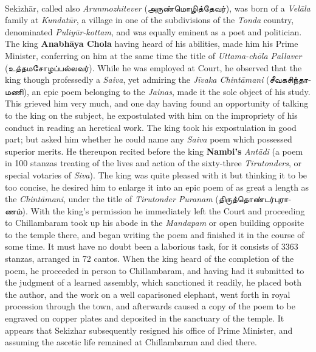 \documentclass{article}
\newcommand{\TamilText}[1]{\texttamil{#1}}
\newcommand{\tam}[1]{\TamilText{#1}}
\begin{document}
\paragraph{}
Sekizh\={a}r, called also \emph{Arunmozhitever} (\tam{அருண்மொழித்தேவர்}), was born of a \emph{Vel\={a}la} family at \emph{Kundat\={u}r}, a village in one of the subdivisions of the \emph{Tonda} country, denominated \emph{Puliy\={u}r-kottam}, and was equally eminent as a poet and politician. The king \textbf{Anabh\={a}ya Chola} having heard of his abilities, made him his Prime Minister, conferring on him at the same time the title of \emph{Uttama-ch\={o}la Pallaver} (\tam{உத்தமசோழப்பல்லவர்}). While he was employed at Court, he observed that the king though professedly a \emph{Saiva}, yet admiring the \emph{J\={i}vaka Chint\={a}mani} (\tam{சீவகசிந்தாமணி}), an epic poem belonging to the \emph{Jainas}, made it the sole object of his study. This grieved him very much, and one day having found an opportunity of talking to the king on the subject, he expostulated with him on the impropriety of his conduct in reading an heretical work. The king took his expostulation in good part; but asked him whether he could name any \emph{Saiva} poem which possessed superior merits. He thereupon recited before the king \textbf{Nambi's} \emph{Ant\={a}di} (a poem in 100 stanzas treating of the lives and action of the sixty-three \emph{Tirutonders}, or special votaries of \emph{Siva}). The king was quite pleased with it but thinking it to be too concise, he desired him to enlarge it into an epic poem of as great a length as the \emph{Chint\={a}mani}, under the title of \emph{Tirutonder Puranam} (\tam{திருத்தொண்டர்புராணம்}). With the king's permission he immediately left the Court and proceeding to Chillambaram took up his abode in the \emph{Mandapam} or open building opposite to the temple there, and began writing the poem and finished it in the course of some time. It must have no doubt been a laborious task, for it consists of 3363 stanzas, arranged in 72 cantos. When the king heard of the completion of the poem, he proceeded in person to Chillambaram, and having had it submitted to the judgment of a learned assembly, which sanctioned it readily, he placed both the author, and the work on a well caparisoned elephant, went forth in royal procession through the town, and afterwards caused a copy of the poem to be engraved on copper plates and deposited in the sanctuary of the temple. It appears that Sekizhar subsequently resigned his office of Prime Minister, and assuming the ascetic life remained at Chillambaram and died there.
\end{document}

